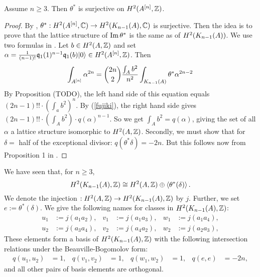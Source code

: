 \begin{proposition}\label{H2Sur} Assume $n\geq 3$. Then
$\theta^*$ is surjective on $H^2(A\hilb{n},\Z)$.
\end{proposition}
\begin{proof}
By \cite[Sect.~7]{Beauville}, $\theta^{\ast} : H^2(A\hilb{n},\C) \rightarrow H^2(\kum{A}{n-1},\C)$ is surjective. 
Then the idea is to prove that the lattice structure of $\im \theta^*$ is the same as of $H^2(\kum{A}{n-1})$.
We use two formulas in \cite[pp.~8--11]{Britze}. Let $b\in H^2(A,\Z)$ and set $\alpha = \frac{1}{(n-1)!}\kq_{1}(1)^{n-1}\kq_1(b)\vac\in H^2(A\hilb{n},\Z)$. Then  
\begin{equation} 
\int_{A\hilb{n}}\alpha^{2n} = \binom{2n}{2} \frac{\int_A b^2}{n^2} \int_{\kum{A}{n-1}} \theta^* \alpha^{2n-2}
\end{equation}
By Proposition (TODO), the left hand side of this equation equals $(2n-1)!!\cdot \left(\int_a b^2\right)^n$. By (\ref{fujiki}), the right hand side gives $(2n-1)!! \cdot \left(\int_A b^2\right) \cdot q(\alpha)^{n-1}$. So
we get
$\int_A b^2 = q(\alpha)$, giving the set of all $\alpha$ a lattice structure isomorphic to $H^2(A,\Z)$. 
Secondly, we must show that for $\delta=$ half of the exceptional divisor: $q(\theta^*\delta) = -2n$. But this follows now from Proposition 1 in \cite{Britze}.
\end{proof}
\begin{notation}\label{BasisH2KA}
 We have seen that, for $n\geq 3$,
 $$
 H^2(\kum{A}{n-1},\Z) \cong H^2(A,\Z) \oplus\left<\theta^*(\delta)\right>.
 $$
We denote the injection $ : H^2(A,\Z) \rightarrow H^2(\kum{A}{n-1},\Z)$ by $j$. Further, we set $e:=\theta^*(\delta)$. We give the following names for classes in $H^2(\kum{A}{n-1},\Z)$:
\begin{align*}
u_1 &:= j(a_1 a_2), & v_1 &:= j(a_1 a_3), & w_1 &:= j(a_1 a_4), \\ 
u_2 &:= j(a_3 a_4), & v_2 &:= j(a_4 a_2), & w_2 &:= j(a_2 a_3),
\end{align*}
These elements form a basis of $H^2(\kum{A}{n-1},\Z)$ with the following intersection relations under the Beauville-Bogomolov form:
\begin{align*}
q(u_1,u_2) &= 1, & q(v_1,v_2) &= 1, & q(w_1,w_2) &= 1,  &
q(e,e)&= -2n,
\end{align*}
and all other pairs of basis elements are orthogonal.
\end{notation}

